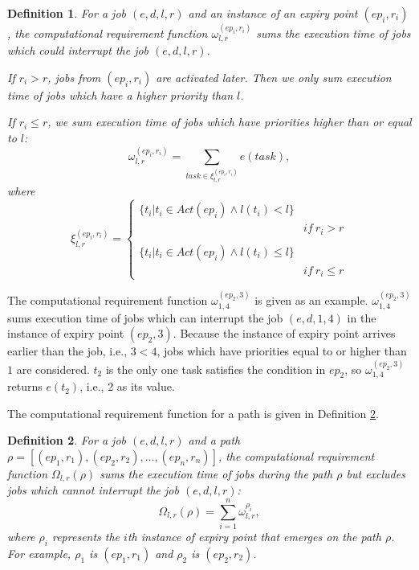 \documentclass[10pt,conference]{IEEEtran}
\newtheorem{definition}{Definition}
\begin{document}
\begin{definition}
For a job $(e,d,l,r)$ and an instance of an expiry point $(ep_i,r_i)$, the computational requirement function $\omega_{l,r}^{(ep_i,r_i)}$ sums the execution time of jobs which could interrupt the job $(e,d,l,r)$.

If $r_i> r$, jobs from $(ep_i,r_i)$ are activated later. Then we only sum execution time of jobs which have a higher priority than $l$. 

If $r_i\leq r$, we sum execution time of jobs which have priorities higher than or equal to $l$:
\begin{equation}\label{equation_loweromega}
\omega_{l,r}^{(ep_i,r_i)}=\sum\limits_{task\in \xi_{l,r}^{(ep_i,r_i)}}e(task),
\end{equation}
where 
\[
\xi_{l,r}^{(ep_i,r_i)}=\begin{cases}
\{t_i|t_i\in Act(ep_i)\wedge l(t_i)<l\}&
\\&if\ r_i>r
\\\\
\{t_i|t_i\in Act(ep_i)\wedge l(t_i)\leq l\}&
\\&if\ r_i\leq r

\end{cases}\]
\end{definition}
The computational requirement function $\omega_{1,4}^{(ep_2,3)}$ is given as an example. $\omega_{1,4}^{(ep_2,3)}$ sums execution time of jobs which can interrupt the job $(e,d,1,4)$ in the instance of expiry point $(ep_2,3)$. Because the instance of expiry point arrives earlier than the job, i.e., $3<4$, jobs which have priorities equal to or higher than $1$ are considered. $t_2$ is the only one task satisfies the condition in $ep_2$, so $\omega_{1,4}^{(ep_2,3)}$ returns $e(t_2)$, i.e., 2 as its value.

The computational requirement function for a path is given in Definition \ref{definition_higheromage}.
\begin{definition}\label{definition_higheromage}
For a job $(e,d,l,r)$ and a path $\rho=[(ep_1,r_1),(ep_2,r_2),\dots,(ep_n,r_n)]$, the computational requirement function $\Omega_{l,r}(\rho)$ sums the execution time of jobs during the path $\rho$ but excludes jobs which cannot interrupt the job $(e,d,l,r)$:
\begin{equation}\label{equation_higheromega}
\Omega_{l,r}(\rho)=\sum_{i=1}^n\omega_{l,r}^{\rho_i},
\end{equation}
where $\rho_i$ represents the $i$th instance of expiry point that emerges on the path $\rho$. For example, $\rho_1$ is $(ep_1,r_1)$ and $\rho_2$ is $(ep_2,r_2)$. 
\end{definition}
\end{document}
